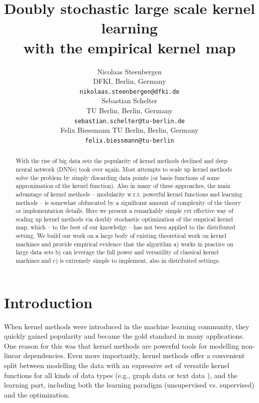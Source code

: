 \documentclass{article} %
\title{Doubly stochastic large scale kernel learning \\ with the empirical kernel map}
\author{
Nicolaas Steenbergen\\
DFKI, Berlin, Germany\\
\texttt{nikolaas.steenbergen@dfki.de}\\
\And
Sebastian Schelter\\
TU Berlin, Berlin, Germany\\
\texttt{sebastian.schelter@tu-berlin.de}\\
\And
Felix Biessmann
TU Berlin, Berlin, Germany\\
\texttt{felix.biessmann@tu-berlin}\\
}
\begin{document}
\maketitle

\begin{abstract} 
With the rise of big data sets the popularity of kernel methods declined and deep neural network (DNNs) took over again. Most attempts to scale up kernel methods  solve the problem by simply discarding data points (or basis functions of some approximation of the kernel function). Also in many of these approaches, the main advantage of kernel methods -- modularity w.r.t. powerful kernel functions and learning methods -- is somewhat obfuscated by a significant amount of complexity of the theory or implementation details. Here we present a remarkably simple yet effective way of scaling up kernel methods via doubly stochastic optimization of the emprical kernel map, which -- to the best of our knowledge -- has not been applied to the distributed setting. We build our work on a large body of existing theoretical work on kernel machines and provide empirical evidence that the algorithm a) works in practice on large data sets b) can leverage the full power and versatility of classical kernel machines and c) is extremely simple to implement, also in distributed settings. 
\end{abstract} 


\section{Introduction\vspace{-0.1in}}
\indent When kernel methods \cite{Muller:2001p2592,learning_with_kernels,shawe2004kernel} were introduced in the machine learning community, they quickly gained popularity and became the gold standard in many applications. One reason for this was that kernel methods are powerful tools for modelling non-linear dependencies. Even more importantly, kernel methods offer a convenient split between modelling the data with an expressive set of versatile kernel functions for all kinds of data types (e.g., graph data \cite{Borgwardt:2007p13941} or text data \cite{John2000}), and the learning part, including both the learning paradigm (unsupervised vs. supervised) and the optimization. 
\end{document}
